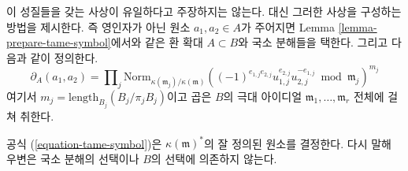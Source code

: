 \medskip\noindent
이 성질들을 갖는 사상이 유일하다고 주장하지는 않는다. 대신 그러한
사상을 구성하는 방법을 제시한다. 즉 영인자가 아닌 원소
$a_1, a_2 \in A$가 주어지면 Lemma
\ref{lemma-prepare-tame-symbol}에서와 같은 환 확대 $A \subset B$와
국소 분해들을 택한다. 그리고 다음과 같이 정의한다.
\begin{equation}
\label{equation-tame-symbol}
\partial_A(a_1, a_2) = \prod\nolimits_j
\text{Norm}_{\kappa(\mathfrak m_j)/\kappa(\mathfrak m)}
((-1)^{e_{1, j}e_{2, j}}u_{1, j}^{e_{2, j}}u_{2, j}^{-e_{1, j}}
\bmod \mathfrak m_j)^{m_j}
\end{equation}
여기서 $m_j = \text{length}_{B_j}(B_j/\pi_j B_j)$이고 곱은 $B$의
극대 아이디얼 $\mathfrak m_1, \ldots, \mathfrak m_r$ 전체에 걸쳐
취한다.
\begin{lemma}
\label{lemma-well-defined-tame-symbol}
공식 (\ref{equation-tame-symbol})은 $\kappa(\mathfrak m)^*$의 잘 정의된
원소를 결정한다. 다시 말해 우변은 국소 분해의 선택이나 $B$의 선택에
의존하지 않는다.
\end{lemma}

